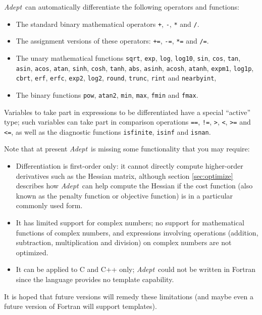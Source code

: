 \documentclass[a4,oneside]{book}
\def\codesize{\small}
\def\Adept{\emph{Adept}}
\def\code#1{{\codesize\texttt{#1}}}
\begin{document}
%
\Adept\ can automatically differentiate the following
operators and functions:
\begin{itemize}
\item The standard binary mathematical operators \code{+}, \code{-},
  \code{*} and \code{/}.
\item The assignment versions of these operators:
  \code{+=}, \code{-=}, \code{*=} and \code{/=}.
\item The unary mathematical functions \code{sqrt}, \code{exp},
  \code{log}, \code{log10}, \code{sin}, \code{cos}, \code{tan},
  \code{asin}, \code{acos}, \code{atan}, \code{sinh}, \code{cosh},
  \code{tanh}, \code{abs}, \code{asinh}, \code{acosh}, \code{atanh},
  \code{expm1}, \code{log1p}, \code{cbrt}, \code{erf}, \code{erfc},
  \code{exp2}, \code{log2}, \code{round}, \code{trunc}, \code{rint}
  and \code{nearbyint},
\item The binary functions \code{pow}, \code{atan2}, \code{min},
  \code{max}, \code{fmin} and \code{fmax}.
\end{itemize}
Variables to take part in expressions to be differentiated have a
special ``active'' type; such variables can take part in comparison
operations \code{==}, \code{!=}, \code{>}, \code{<}, \code{>=} and
\code{<=}, as well as the diagnostic functions \code{isfinite},
\code{isinf} and \code{isnan}.

Note that at present \Adept\ is missing some functionality that you may
require:

\begin{itemize}
\item Differentiation is first-order only: it cannot directly compute
  higher-order derivatives such as the Hessian matrix, although
  section \ref{sec:optimize} describes how \Adept\ can help compute
  the Hessian if the cost function (also known as the penalty function
  or objective function) is in a particular commonly used form.
\item It has limited support for complex numbers; no support for
  mathematical functions of complex numbers, and expressions involving
  operations (addition, subtraction, multiplication and division) on
  complex numbers are not optimized.
\item It can be applied to C and C++ only; \Adept\ could not be
  written in Fortran since the language provides no template
  capability.
\end{itemize}%
%
It is hoped that future versions will remedy these limitations (and
maybe even a future version of Fortran will support templates).
\end{document}
